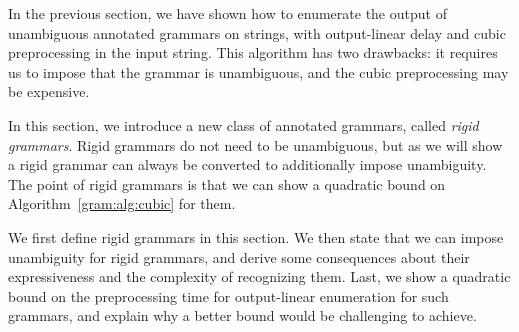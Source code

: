 %
%

In the previous section, we have shown how to enumerate the output of
unambiguous annotated grammars on strings, with output-linear delay and cubic
preprocessing in the input string. This algorithm has two drawbacks: it requires
us to impose that the grammar is unambiguous, and the cubic preprocessing 
%
may be expensive.

In this section, we introduce a new class of annotated grammars, called
\emph{rigid grammars}. Rigid grammars do not need to be
unambiguous, but as we will show a rigid grammar can always be converted to
additionally impose unambiguity. The point of rigid grammars is that we can show
a quadratic bound on Algorithm~\ref{gram:alg:cubic} for them.

We first define rigid grammars in this section. We then state that we can impose
unambiguity for rigid grammars, and derive some consequences about their
expressiveness and the complexity of recognizing
them. Last, we show a quadratic bound on the
preprocessing time for output-linear enumeration for such grammars, and explain
why a better bound would be challenging to achieve.

%
%
%
%
%
%

